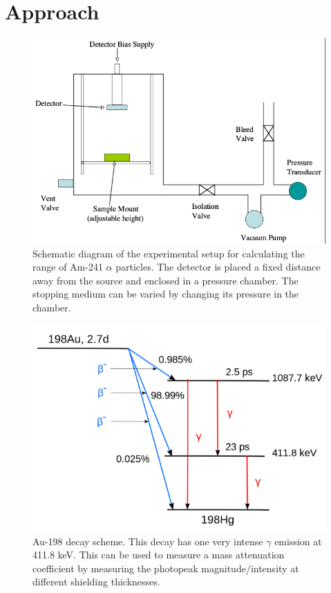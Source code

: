 \section{Approach}

\begin{figure}[t!]
\centering
\includegraphics[scale=0.7]{alpha_setup.png}
\caption{Schematic diagram of the experimental setup for calculating the range of Am-241 $\alpha$ particles. The detector is placed a fixed distance away from the source and enclosed in a pressure chamber. The stopping medium can be varied by changing its pressure in the chamber.}
\label{fig:alpha-setup}
\end{figure}

\begin{figure}
\centering
\includegraphics[scale=0.7]{au198.png}
\caption{Au-198 decay scheme. This decay has one very intense $\gamma$ emission at 411.8 keV. This can be used to measure a mass attenuation coefficient by measuring the photopeak magnitude/intensity at different shielding thicknesses.}
\label{fig:au198}
\end{figure}

